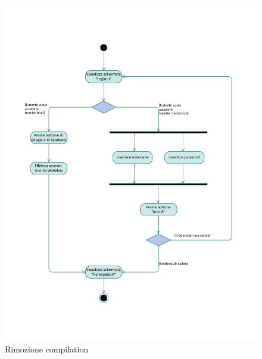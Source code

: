 \documentclass{natourDoc}
\begin{document}
\newpage
\begin{figure}[!htbp]
	\centering
	\includegraphics[width=\textwidth, page=7]{./diagrams/activity.pdf}
	\caption{Rimozione compilation}
\end{figure}
\FloatBarrier
\end{document}
